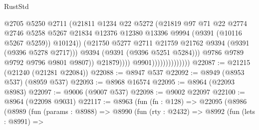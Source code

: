 \begin{lexlean}{RustStd}
\begin{coremodule}
                                              @2705
                                              @5250
                                              @2711
                                              (@21811
                                                @1234
                                                @22
                                                @5272
                                                (@21819
                                                  @97
                                                  @71
                                                  @22
                                                  @2774
                                                  @2746
                                                  @5258
                                                  @5267
                                                  @21834
                                                  @12376
                                                  @12380
                                                  @13396
                                                  @9994
                                                  (@9391 (@10116 @5267 @5259))
                                                  @10124))
                                              (@21750
                                                @5277
                                                @2711
                                                @21759
                                                @21762
                                                @9394
                                                (@9391 (@9396 @5278 @2717)))
                                              @9394
                                              (@9391 (@9396 @5251 @5284)))
                                            @9786
                                            @9789
                                            @9792
                                            @9796
                                            @9801
                                            @9807))
                                        @21879))))
                                @9901))))))))))))))
@22087 := @21215 (@21240 (@21281 @22084))
@22088 := @8947 @537
@22092 := @8949 (@8953 @537) (@8959 @537)
@22093 := @8968 @16574
@22095 := @8964 (@22093 @8983)
@22097 := @9006 (@9007 @537)
@22098 := @9002 @22097
@22100 := @8964 (@22098 @9031)
@22117 := @8963
    (fun (fn : @128) =>
    @22095
      (@8986
        (@8989
          (fun (params : @8988) =>
          @8990
            (fun (rty : @2432) =>
            @8992
              (fun (lets : @8991) =>

\end{coremodule}
\end{lexlean}
